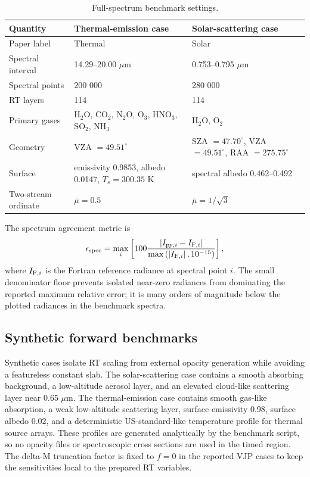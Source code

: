 \documentclass[gmd, manuscript]{copernicus}
\begin{document}
\begin{table}[t]
\caption{Full-spectrum benchmark settings.}
\label{tab:full_spectrum_settings}
\centering
\begin{tabular}{lll}
\hline
Quantity & Thermal-emission case & Solar-scattering case \\
\hline
Paper label & Thermal & Solar \\
Spectral interval & 14.29--20.00 $\mu$m & 0.753--0.795 $\mu$m \\
Spectral points & 200 000 & 280 000 \\
RT layers & 114 & 114 \\
Primary gases & H$_2$O, CO$_2$, N$_2$O, O$_3$, HNO$_3$, SO$_2$, NH$_3$ & H$_2$O, O$_2$ \\
Geometry & VZA $=49.51^\circ$ & SZA $=47.70^\circ$, VZA $=49.51^\circ$, RAA $=275.75^\circ$ \\
Surface & emissivity 0.9853, albedo 0.0147, $T_s=300.35$ K &
spectral albedo 0.462--0.492 \\
Two-stream ordinate & $\bar{\mu}=0.5$ & $\bar{\mu}=1/\sqrt{3}$ \\
\hline
\end{tabular}
\end{table}

The spectrum agreement metric is
\begin{equation}
  \epsilon_{\rm spec}
  =
  \max_i
  \left[
    100
    \frac{\left|I_{{\rm py},i}-I_{{\rm F},i}\right|}
         {\max\left(\left|I_{{\rm F},i}\right|,10^{-15}\right)}
  \right],
  \label{eq:spectrum_error}
\end{equation}
where $I_{{\rm F},i}$ is the Fortran reference radiance at spectral point $i$.
The small denominator floor prevents isolated near-zero radiances from dominating the
reported maximum relative error; it is many orders of magnitude below the plotted
radiances in the benchmark spectra.

\subsection{Synthetic forward benchmarks}

Synthetic cases isolate RT scaling from external opacity generation while avoiding a
featureless constant slab.  The solar-scattering case contains a smooth absorbing
background, a low-altitude aerosol layer, and an elevated cloud-like scattering layer
near 0.65 $\mu$m.  The thermal-emission case contains smooth gas-like absorption,
a weak low-altitude scattering layer, surface emissivity 0.98, surface albedo 0.02, and
a deterministic US-standard-like temperature profile for thermal source arrays.  These
profiles are generated analytically by the benchmark script, so no opacity files or
spectroscopic cross sections are used in the timed region.  The delta-M truncation
factor is fixed to $f=0$ in the reported VJP cases to keep the sensitivities local to
the prepared RT variables.
\end{document}
